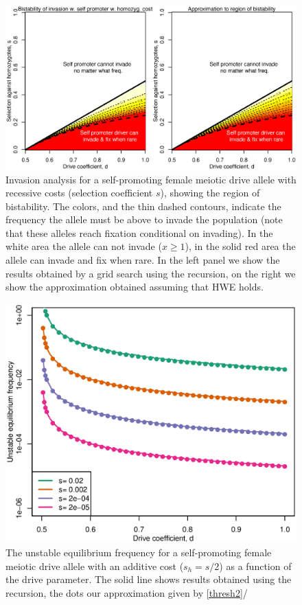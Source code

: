 \documentclass[12pt,letterpaper]{article}
\begin{document}
\begin{figure}

\includegraphics[width = \textwidth]{../Scripts/homozyg_bistability.eps}
\caption{Invasion analysis for a self-promoting female meiotic drive allele with
  recessive costs (selection coefficient $s$), showing the region of
  bistability. The colors, and the thin dashed contours, indicate the
  frequency the allele must be above to invade the population (note
  that these alleles reach fixation conditional on invading). In the
  white area the allele can not invade ($x \geq1$), in the solid red
  area the allele can invade and fix when rare. In the left panel we
  show the results obtained by a grid search using the recursion, on
  the right we show the approximation obtained assuming that HWE
  holds. }  
\label{Bistab_homozyg_cost_fig}
\end{figure}

\begin{figure}
\includegraphics[width = 0.8 \textwidth]{Figures/bistable_x_vs_d_additive_s.eps} 
\caption{The unstable equilibrium frequency for a self-promoting
  female meiotic drive allele with an additive cost ($s_h=s/2$) as a
  function of the drive parameter. The solid line shows results
  obtained using the recursion, the dots our approximation given by \eqref{thresh2}/}  \label{bistable_additive}
\end{figure}
\end{document}
